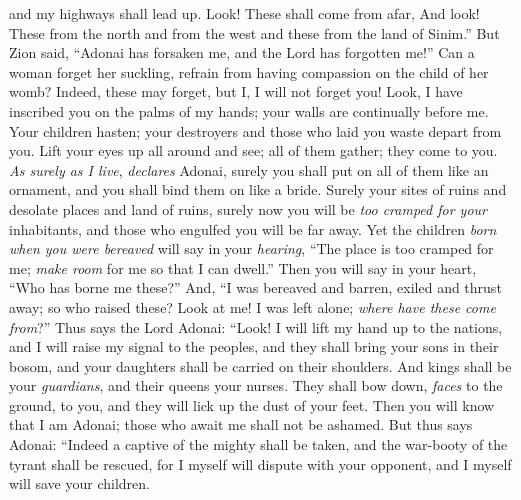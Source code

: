\begin{biblechapter}
and my highways shall lead up.
\verse Look! These shall come from afar, 
And look! These from the north and from the west 
and these from the land of Sinim.”
 But Zion said, “Adonai has forsaken me, 
and the Lord has forgotten me!”
\verse Can a woman forget her suckling, 
refrain from having compassion on the child of her womb? 
Indeed, these may forget, 
but I, I will not forget you!
\verse Look, I have inscribed you on the palms of my hands; 
your walls are continually before me.
\verse Your children hasten; 
your destroyers and those who laid you waste depart from you.
\verse Lift your eyes up all around and see; 
all of them gather; they come to you. 
\textit{As surely as I live}, 
\textit{declares} Adonai, 
surely you shall put on all of them like an ornament, 
and you shall bind them on like a bride.
\verse Surely your sites of ruins and desolate places and land of ruins, surely now you will be \textit{too cramped for your} inhabitants, 
and those who engulfed you will be far away.
\verse Yet the children \textit{born when you were bereaved} will say in your \textit{hearing}, “The place is too cramped for me; 
\textit{make room} for me so that I can dwell.”
\verse Then you will say in your heart, “Who has borne me these?” 
And, “I was bereaved and barren, 
exiled and thrust away; 
so who raised these? 
Look at me! I was left alone; 
\textit{where have these come from}?”
\verse Thus says the Lord Adonai:
\verse “Look! I will lift my hand up to the nations, 
and I will raise my signal to the peoples, 
and they shall bring your sons in their bosom, 
and your daughters shall be carried on their shoulders.
\verse And kings shall be your \textit{guardians}, 
and their queens your nurses. 
They shall bow down, \textit{faces} to the ground, to you, 
and they will lick up the dust of your feet. 
Then you will know that I am Adonai; 
those who await me shall not be ashamed.
\verse But thus says Adonai:
\verse “Indeed a captive of the mighty shall be taken, 
and the war-booty of the tyrant shall be rescued, 
for I myself will dispute with your opponent, 
and I myself will save your children.
\end{biblechapter}

